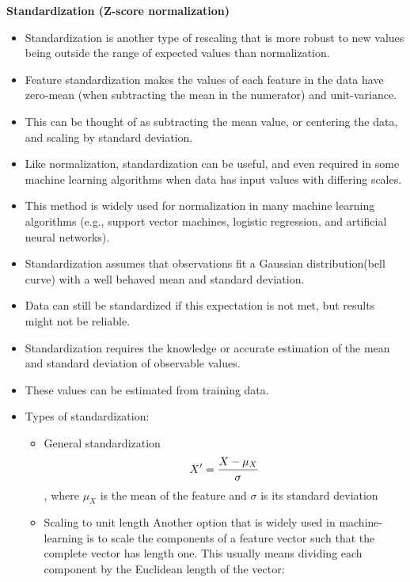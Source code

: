\documentclass[11pt]{article}
\begin{document}
    \textbf{Standardization (Z-score normalization)}
    \begin{itemize}
        \item Standardization is another type of rescaling that is more robust to new values being outside the range of expected values than normalization.
        \item Feature standardization makes the values of each feature in the data have zero-mean (when subtracting the mean in the numerator) and unit-variance.
        \item This can be thought of as subtracting the mean value, or centering the data, and scaling by standard deviation.
        \item Like normalization, standardization can be useful, and even required in some machine learning algorithms when data has input values with differing scales.
        \item This method is widely used for normalization in many machine learning algorithms (e.g., support vector machines, logistic regression, and artificial neural networks).
        \item Standardization assumes that observations fit a Gaussian distribution(bell curve) with a well behaved mean and standard deviation.
        \item Data can still be standardized if this expectation is not met, but results might not be reliable.
        \item Standardization requires the knowledge or accurate estimation of the mean and standard deviation of observable values.
        \item These values can be estimated from training data.
        \item Types of standardization:
        \begin{itemize}
            \item General standardization
            \begin{equation} \label{eq:standardization_general}
                \large{ X' = \frac{ X - \mu_X } { \sigma } }
            \end{equation},
            where $\mu_X$ is the mean of the feature and $\sigma$ is its standard deviation
            \item Scaling to unit length
            Another option that is widely used in machine-learning is to scale the components of a feature vector such that the complete vector has length one.
            This usually means dividing each component by the Euclidean length of the vector:

\end{itemize}
\end{itemize}
\end{document}
